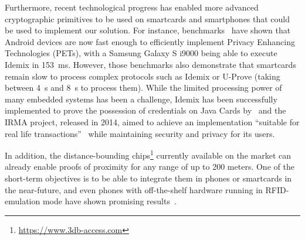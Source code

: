 Furthermore, recent technological progress has enabled more advanced cryptographic primitives to be used on smartcards and smartphones that could be used to implement our solution.
For instance, benchmarks~\cite{Benchmarking} have shown that Android devices are now fast enough to efficiently implement Privacy Enhancing Technologies (PETs), with a Samsung Galaxy S i9000 being able to execute Idemix in \SI{153}{\milli\second}. 
However, those benchmarks also demonstrate that smartcards remain slow to process complex protocols such as Idemix or U-Prove (taking between \SI{4}{\second} and \SI{8}{\second} to process them). %
While the limited processing power of many embedded systems has been a challenge, Idemix has been successfully implemented to prove the possession of credentials on Java Cards by~\citet{Bichsel} and the IRMA project, released in 2014, aimed to achieve an implementation ``suitable for real life transactions''~\cite{IRMA} while maintaining security and privacy for its users. 

In addition, the distance-bounding chips\footnote{\url{https://www.3db-access.com}} currently available on the market can already enable proofs of proximity for any range of up to 200 meters.
One of the short-term objectives is to be able to integrate them in phones or smartcards in the near-future, and even phones with off-the-shelf hardware running in RFID-emulation mode have shown promising results~\cite{DBonSmartphones}.








